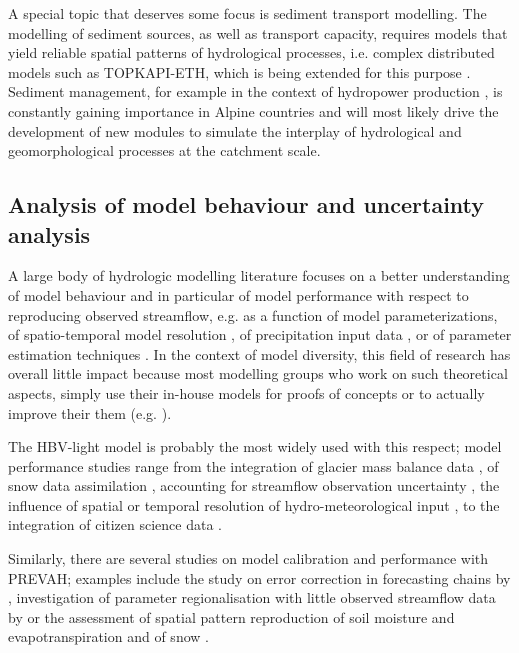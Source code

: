 \documentclass[10pt,a4paper]{article}
\begin{document}
A special topic that deserves some focus is sediment transport modelling. The modelling of sediment sources, as well as transport capacity, requires models that yield reliable spatial patterns of hydrological processes, i.e. complex distributed models such as TOPKAPI-ETH, which is being extended for this purpose \citep{Konz_2011,Battista2020}. Sediment management, for example in the context of hydropower production \citep{RaymondPralong2015,Gabbud2015}, is constantly gaining importance in Alpine countries and will most likely drive the development of new modules to simulate the interplay of hydrological and geomorphological processes at the catchment scale.

\subsection{Analysis of model behaviour and uncertainty analysis}
\label{sec:application:uncertainty}

A large body of hydrologic modelling literature focuses on a better understanding of model behaviour and in particular of model performance with respect to reproducing observed streamflow, e.g. as a function of model parameterizations, of spatio-temporal model resolution \citep{Brunner_2019}, of precipitation input data \citep{Sikorska2016,Muller-Thomy2019},  or of parameter estimation techniques \citep{Foglia_2009}. In the context of model diversity, this field of research has overall little impact because most modelling groups who work on such theoretical aspects, simply use their in-house models for proofs of concepts or to actually improve their them (e.g. \citealt{Schaefli2007,Hingray2010}).

The HBV-light model is probably the most widely used with this respect; model performance studies range from the integration of glacier mass balance data \citep{Finger2015,schaeflihuss11}, of snow data assimilation \citep{Griessinger2016}, accounting for streamflow observation uncertainty \citep{Westerberg2020}, the influence of spatial or temporal resolution of hydro-meteorological input \citep{GironsLopez2016,Sikorska2018}, to the integration of citizen science data \citep{Etter2020}.

Similarly, there are several studies on model calibration and performance with PREVAH; examples include the study on error correction in forecasting chains by \citet{Bogner_2018}, investigation of parameter regionalisation with little observed streamflow data by \citet{Viviroli2015} or the assessment of spatial pattern reproduction of soil moisture and evapotranspiration \citep{Zappa2003} and of snow \citep{Zappa2008a}.
\end{document}
